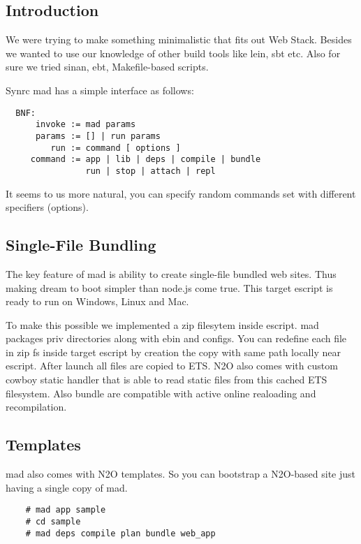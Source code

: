 \subsection{Introduction}

We were trying to make something minimalistic that fits out Web Stack.
Besides we wanted to use our knowledge of other build tools like lein, sbt etc.
Also for sure we tried sinan, ebt, Makefile-based scripts.

Synrc mad has a simple interface as follows:

\vspace{1\baselineskip}
\begin{lstlisting}
  BNF:
      invoke := mad params
      params := [] | run params
         run := command [ options ]
     command := app | lib | deps | compile | bundle
                run | stop | attach | repl
\end{lstlisting}
\vspace{1\baselineskip}

It seems to us more natural, you can specify random
commands set with different specifiers (options).

\subsection{Single-File Bundling}

The key feature of mad is ability to create single-file bundled web sites.
Thus making dream to boot simpler than node.js come true.
This target escript is ready to run on Windows, Linux and Mac.

To make this possible we implemented a zip filesytem inside escript.
mad packages priv directories along with ebin and configs.
You can redefine each file in zip fs inside target
escript by creation the copy with same path locally near escript.
After launch all files are copied to ETS.
N2O also comes with custom cowboy static handler that is able to
read static files from this cached ETS filesystem.
Also bundle are compatible with active online realoading and recompilation.

\subsection{Templates}

mad also comes with N2O templates. So you can bootstrap a N2O-based site
just having a single copy of mad.

\vspace{1\baselineskip}
\begin{lstlisting}
    # mad app sample
    # cd sample
    # mad deps compile plan bundle web_app
\end{lstlisting}
\vspace{1\baselineskip}

